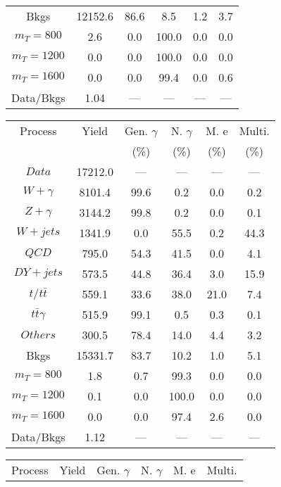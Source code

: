 \begin{figure}
\begin{minipage}[c]{0.32\textwidth}
{\begin{tabular}{cccccc}
Bkgs &  12152.6 &  86.6 &  8.5 &  1.2 &  3.7\\
$ m_{T} = 800 $ &  2.6 &  0.0 &  100.0 &  0.0 &  0.0\\
$ m_{T} = 1200 $ &  0.0 &  0.0 &  100.0 &  0.0 &  0.0\\
$ m_{T} = 1600 $ &  0.0 &  0.0 &  99.4 &  0.0 &  0.6\\
Data/Bkgs &  1.04 &  --- &  --- &  --- &  ---\\
\hline
\end{tabular}
}
\end{minipage}
\begin{minipage}[c]{0.32\textwidth}
\centering
\tiny{
\begin{tabular}{cccccc}
\hline
Process & Yield & Gen. $\gamma$ & N. $\gamma$ & M. e & Multi. \\
 &  & (\%) & (\%) & (\%) & (\%)  \\
\hline
                                                                      $ Data $ &  17212.0 &  --- &  --- &  --- &  ---\\
$ W+\gamma $ &  8101.4 &  99.6 &  0.2 &  0.0 &  0.2\\
$ Z+\gamma $ &  3144.2 &  99.8 &  0.2 &  0.0 &  0.1\\
$ W+jets $ &  1341.9 &  0.0 &  55.5 &  0.2 &  44.3\\
$ QCD $ &  795.0 &  54.3 &  41.5 &  0.0 &  4.1\\
$ DY+jets $ &  573.5 &  44.8 &  36.4 &  3.0 &  15.9\\
$ t/t\bar{t} $ &  559.1 &  33.6 &  38.0 &  21.0 &  7.4\\
$ t\bar{t}\gamma $ &  515.9 &  99.1 &  0.5 &  0.3 &  0.1\\
$ Others $ &  300.5 &  78.4 &  14.0 &  4.4 &  3.2\\
Bkgs &  15331.7 &  83.7 &  10.2 &  1.0 &  5.1\\
$ m_{T} = 800 $ &  1.8 &  0.7 &  99.3 &  0.0 &  0.0\\
$ m_{T} = 1200 $ &  0.1 &  0.0 &  100.0 &  0.0 &  0.0\\
$ m_{T} = 1600 $ &  0.0 &  0.0 &  97.4 &  2.6 &  0.0\\
Data/Bkgs &  1.12 &  --- &  --- &  --- &  ---\\
\hline
\end{tabular}
}
\end{minipage}
\begin{minipage}[c]{0.32\textwidth}
\centering
\tiny{
\begin{tabular}{cccccc}
\hline
Process & Yield & Gen. $\gamma$ & N. $\gamma$ & M. e & Multi. \\

\end{tabular}}
\end{minipage}
\end{figure}
